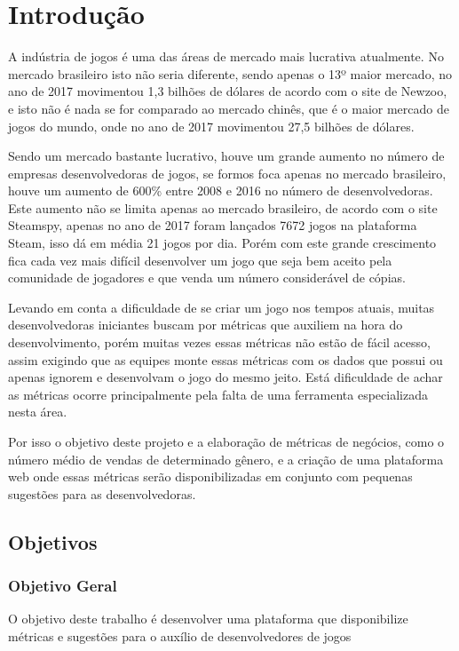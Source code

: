 \chapter*[Introdução]{Introdução}
A indústria de jogos é uma das áreas de mercado mais lucrativa atualmente. No mercado brasileiro isto não seria diferente, sendo apenas o 13º maior mercado, no ano de 2017 movimentou 1,3 bilhões de dólares de acordo com o site de Newzoo\cite{newzoo_brasil}, e isto não é nada se for comparado ao mercado chinês, que é o maior mercado de jogos do mundo, onde no ano de 2017 movimentou 27,5 bilhões de dólares\cite{newzoo_china}.

Sendo um mercado bastante lucrativo, houve um grande aumento no número de empresas desenvolvedoras de jogos, se formos foca apenas no mercado brasileiro, houve um aumento de 600\% entre 2008 e 2016 no número de desenvolvedoras\cite{desenvolvedoras_crescimento}. Este aumento não se limita apenas ao mercado brasileiro, de acordo com o site Steamspy\cite{steam_spy}, apenas no ano de 2017 foram lançados 7672 jogos na plataforma Steam, isso dá em média 21 jogos por dia. Porém com este grande crescimento fica cada vez mais difícil desenvolver um jogo que seja bem aceito pela comunidade de jogadores e que venda um número considerável de cópias.

Levando em conta a dificuldade de se criar um jogo nos tempos atuais, muitas desenvolvedoras iniciantes buscam por métricas que auxiliem na hora do desenvolvimento, porém muitas vezes essas métricas não estão de fácil acesso, assim exigindo que as equipes monte essas métricas com os dados que possui ou apenas ignorem e desenvolvam o jogo do mesmo jeito. Está dificuldade de achar as métricas ocorre principalmente pela falta de uma ferramenta especializada nesta área.

Por isso o objetivo deste projeto e a elaboração de métricas de negócios, como o número médio de vendas de determinado gênero, e a criação de uma plataforma web onde essas métricas serão disponibilizadas em conjunto com pequenas sugestões para as desenvolvedoras.

\section*{Objetivos}
	\subsection*{Objetivo Geral}
	O objetivo deste trabalho é desenvolver uma plataforma que disponibilize métricas e sugestões para o auxílio de desenvolvedores de jogos
